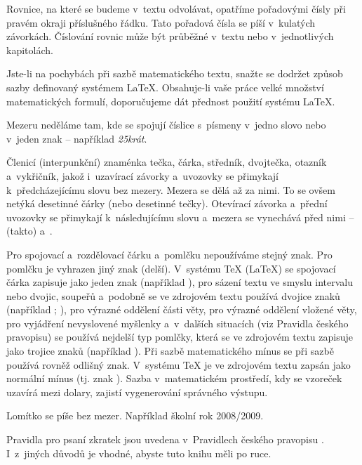 Rovnice, na které se budeme v~textu odvolávat, opatříme pořadovými čísly při pravém okraji příslušného řádku. Tato pořadová čísla se píší v~kulatých závorkách. Číslování rovnic může být průběžné v~textu nebo v~jednotlivých kapitolách.

Jste-li na pochybách při sazbě matematického textu, snažte se dodržet způsob sazby definovaný systémem LaTeX. Obsahuje-li vaše práce velké množství matematických formulí, doporučujeme dát přednost použití systému LaTeX.

Mezeru neděláme tam, kde se spojují číslice s~písmeny v~jedno slovo nebo v~jeden znak -- například {\it 25krát}.

Členicí (interpunkční) znaménka tečka, čárka, středník, dvojtečka, otazník a~vykřičník, jakož i~uzavírací závorky a~uvozovky se přimykají k~předcházejícímu slovu bez mezery. Mezera se dělá až za nimi. To se ovšem netýká desetinné čárky (nebo desetinné tečky). Otevírací závorka a~přední uvozovky se přimykají k~následujícímu slovu a~mezera se vynechává před nimi -- (takto) a~.

Pro spojovací a~rozdělovací čárku a~pomlčku nepoužíváme stejný znak. Pro pomlčku je vyhrazen jiný znak (delší). V~systému TeX (LaTeX) se spojovací čárka zapisuje jako jeden znak  (například ), pro sázení textu ve smyslu intervalu nebo dvojic, soupeřů a~podobně se ve zdrojovém textu používá dvojice znaků  (například ; ), pro výrazné oddělení části věty, pro výrazné oddělení vložené věty, pro vyjádření nevyslovené myšlenky a~v~dalších situacích (viz Pravidla českého pravopisu) se používá nejdelší typ pomlčky, která se ve zdrojovém textu zapisuje jako trojice znaků  (například ). Při sazbě matematického mínus se při sazbě používá rovněž odlišný znak. V~systému TeX je ve zdrojovém textu zapsán jako normální mínus (tj. znak ). Sazba v~matematickém prostředí, kdy se vzoreček uzavírá mezi dolary, zajistí vygenerování správného výstupu.

Lomítko se píše bez mezer. Například školní rok 2008/2009.

Pravidla pro psaní zkratek jsou uvedena v~Pravidlech českého pravopisu \cite{Pravidla}. I~z~jiných důvodů je vhodné, abyste tuto knihu měli po ruce. 


